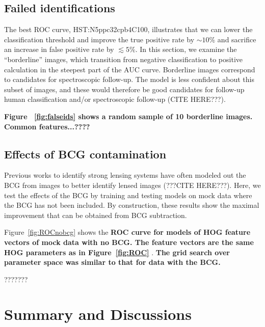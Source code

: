 \documentclass{emulateapj}
\newcommand{\todo}[1]{{\bf\color{blue} #1}}
\def\lsim{\lesssim}
\begin{document}
\subsection{Failed identifications}\label{sec:failedids}

The best ROC curve, HST:N5ppc32cpb4C100, illustrates that we can lower
the classification threshold and improve the true positive rate by
$\sim10\%$ and sacrifice an increase in false positive rate by
$\lsim5\%$.  In this section, we examine the ``borderline'' images,
which transition from negative classification to positive calculation
in the steepest part of the AUC curve.  Borderline images correspond
to candidates for spectroscopic follow-up.  The model is less
confident about this subset of images, and these would therefore be
good candidates for follow-up human classification and/or
spectroscopic follow-up (CITE HERE???).

\todo{Figure ~\ref{fig:falseids} shows a random sample of 10 borderline
images.  Common features...????}


\subsection{Effects of BCG contamination}

Previous works to identify strong lensing systems have often modeled
out the BCG from images to better identify lensed images (???CITE
HERE???).  Here, we test the effects of the BCG by training and
testing models on mock data where the BCG has not been included.  By
construction, these results show the maximal improvement that can be
obtained from BCG subtraction.

Figure~\ref{fig:ROCnobcg} shows the \todo{ROC curve for models of HOG
  feature vectors of mock data with no BCG.  The feature vectors are
  the same HOG parameters as in Figure~\ref{fig:ROC} }.  \todo{The
  grid search over parameter space was similar to that for data with
  the BCG.}

???????

\section{Summary and Discussions}
\label{sec:conclusions}
\end{document}
